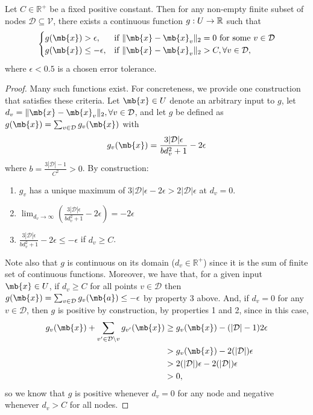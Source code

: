 \begin{lemma}
Let $C \in \mathbb{R}^+$ be a fixed positive constant. 
Then for any non-empty finite subset of nodes $\mathcal{D} \subseteq \mathcal{V}$, there exists a continuous function $g : U \rightarrow \mathbb{R}$ such that 
\begin{equation}
\begin{cases}
g(\mb{x}) > \epsilon,& \textrm{if $\|\mb{x}-\mb{x}_v\|_2 = 0$ for some $v \in \mathcal{D}$}\\
g(\mb{x}) \leq {-}\epsilon,&\textrm{if $\|\mb{x}-\mb{x}_v\|_2 > C, \forall v \in \mathcal{D}$},
\end{cases}
\end{equation}
where $\epsilon < 0.5$ is a chosen error tolerance. 
\end{lemma}
\begin{proof}
Many such functions exist. For concreteness, we provide one construction that satisfies these criteria. 
Let $\mb{x} \in U$ denote an arbitrary input to $g$, let $d_v = \|\mb{x} - \mb{x}_v\|_2, \forall v \in \mathcal{D}$, and let $g$ be defined as $g(\mb{x}) = \sum_{v \in \mathcal{D}} g_v(\mb{x})$ with
\newcommand{\setsize}{|\mathcal{D}|}
\begin{equation}
g_v(\mb{x}) =  \frac{3\setsize\epsilon}{bd_v^2 + 1} - 2\epsilon
\end{equation}
where $b = \frac{3\setsize - 1}{C^2}>0$.
By construction:
\begin{enumerate}
\item
	$g_v$ has a unique maximum of $3\setsize\epsilon-2\epsilon>2\setsize\epsilon$ at $d_v = 0$. 
\item
	$\lim_{d_v \rightarrow \infty}\left(  \frac{3\setsize\epsilon}{bd_v^2 + 1} - 2\epsilon \right) = -2\epsilon$
\item 
   $\frac{3\setsize\epsilon}{bd_v^2 + 1} - 2\epsilon \leq -\epsilon$ if $d_v \geq C$. 
\end{enumerate}
Note also that $g$ is continuous on its domain ($d_v \in \mathbb{R}^+$) since it is the sum of finite set of continuous functions. 
Moreover, we have that, for a given input $\mb{x} \in U$, if $d_v\geq C$ for all points $v \in \mathcal{D}$ then $g(\mb{x}) = \sum_{v \in \mathcal{D}} g_v(\mb{a}) \leq {-}\epsilon$ by property 3 above. 
And, if $d_v=0$ for any $v \in \mathcal{D}$, then $g$ is positive by construction, by properties 1 and 2, since in this case,
\begin{align*}
g_v(\mb{x}) + \sum_{v' \in \mathcal{D}\setminus v}g_{v'}(\mb{x}) &\geq g_v(\mb{x}) - (\setsize -1)2\epsilon\\
&> g_v(\mb{x}) - 2(\setsize)\epsilon\\
&>2(\setsize)\epsilon - 2(\setsize)\epsilon\\
& >0,
\end{align*}
 so we know that $g$ is positive whenever $d_v = 0$ for any node and negative whenever $d_v > C$ for all nodes.  
\end{proof}

